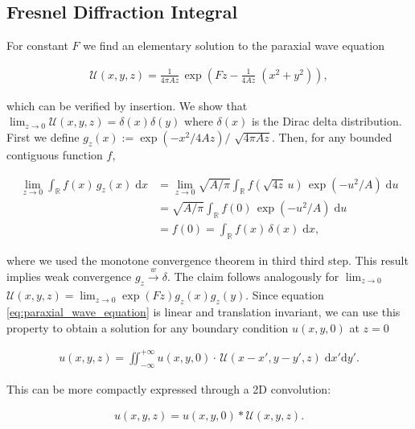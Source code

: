 
\subsection{Fresnel Diffraction Integral}

For constant $F$ we find an elementary solution to the paraxial wave equation

\begin{align*}
\mathcal{U}(x,y,z) = \frac{1}{4 \pi A z} \, \exp \! \left(F z-\frac{1}{4 A z} \; (x^2+y^2)\right),
\end{align*}

which can be verified by insertion. We show that $\lim_{z \rightarrow 0} \mathcal{U}(x,y,z) = \delta(x)\delta(y)$ where $\delta(x)$ is the Dirac delta distribution. First we define $g_z(x) := \exp(-x^2/4 A z) /$ $\sqrt{4 \pi A z}$. Then, for any bounded contiguous function $f$,

\begin{align*}
    \lim_{z \rightarrow 0} \int_\mathbb{R} f(x) \, g_z(x)  \; \text{d}x & = 
    \lim_{z \rightarrow 0} \sqrt{A / \pi} \int_\mathbb{R} f(\sqrt{4 z} \, u) \, \exp(-u^2/A)  \; \text{d}u \\
    & =  \sqrt{A / \pi} \int_\mathbb{R} f(0) \, \exp(-u^2/A)  \; \text{d}u \\
    & = f(0) = \int_\mathbb{R} f(x) \, \delta(x)  \; \text{d}x,
\end{align*}

where we used the monotone convergence theorem in third third step. This result implies weak convergence $g_z \! \xrightarrow[]{w} \! \delta$. The claim follows analogously for $\lim_{z \rightarrow 0} $ $ \mathcal{U}(x,y,z) = \lim_{z \rightarrow 0} \exp(Fz) g_z(x) g_z(y)$. Since equation \eqref{eq:paraxial_wave_equation} is linear and translation invariant, we can use this property to obtain a solution for any boundary condition $u(x,y,0)$ at $z = 0$

\begin{align*}
u(x,y,z) = \iint_{-\infty}^{+\infty} u(x,y,0) \cdot \, \mathcal{U}(x-x',y-y', z) \; \mathrm d x' \mathrm d y'.
\end{align*}

This can be more compactly expressed through a 2D convolution:

\begin{align} \label{eq:fresnel_convolution}
u(x,y,z) =  u(x,y,0) * \mathcal{U}(x,y,z).
\end{align}
